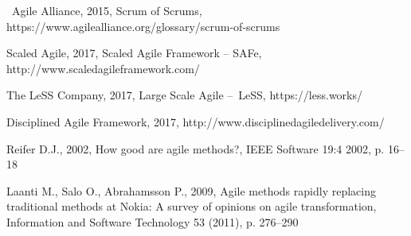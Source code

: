 \noindent [15] Agile Alliance, 2015, Scrum of Scrums,
https://www.agilealliance.org/glossary/scrum-of-scrums

\noindent [16] Scaled Agile, 2017, Scaled Agile Framework – SAFe,
http://www.scaledagileframework.com/

\noindent [17] The LeSS Company, 2017, Large Scale Agile – LeSS,
https://less.works/

\noindent [18] Disciplined Agile Framework, 2017,
http://www.disciplinedagiledelivery.com/

\noindent [19] Reifer D.J., 2002, How good are agile methods?, IEEE Software
19:4 2002, p. 16–18

\noindent [20] Laanti M., Salo O., Abrahamsson P., 2009, Agile methods rapidly
replacing traditional methods at Nokia: A survey of opinions on agile
transformation, Information and Software Technology 53 (2011), p. 276–290
